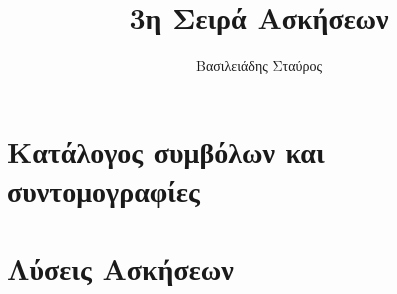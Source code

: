 \documentclass[twoside, openright, hidelinks, a4paper, 12pt]{book}%
\title{\color{teal}3η Σειρά Ασκήσεων}
\author{Βασιλειάδης Σταύρος}
\newcommand\AtPageUpperRight[1]{\AtPageUpperLeft{%
		\put(\LenToUnit{\paperwidth},\LenToUnit{0\paperheight}){#1}%
}}%
\newcommand\AtPageLowerRight[1]{\AtPageLowerLeft{%
		\put(\LenToUnit{\paperwidth},\LenToUnit{0\paperheight}){#1}%
}}%
\newcommand{\beautify}{%
	\AddToShipoutPictureBG{%
		\AtPageUpperLeft{\put(0,-25){\pgfornament[width=1.75cm]{61}}}
		\AtPageUpperRight{\put(-50,-25){\pgfornament[width=1.75cm,symmetry=v]{61}}}
		\AtPageLowerLeft{\put(0,25){\pgfornament[width=1.75cm,symmetry=h]{61}}}
		\AtPageLowerRight{\put(-50,25){\pgfornament[width=1.75cm,symmetry=c]{61}}}
	}
}
\newcommand{\simplify}{%
}
\begin{document}
	




\renewcommand{\contentsname}{Περιεχόμενα}
\renewcommand{\listfigurename}{Λίστα Σχημάτων}
\renewcommand{\listtablename}{Λίστα Πινάκων}
\renewcommand{\chaptername}{\centering{ΜΕΡΟΣ}}
\renewcommand{\appendixname}{Παράρτημα}
\renewcommand{\bibname}{Βιβλιογραφία}
\renewcommand\thesection{\color{violet}\arabic{section}}
\chapterfont{\color{magenta}}

\makeatletter
\newcommand*{\greek}[1]{%
	\expandafter\@greek\csname c@#1\endcsname
}
\newcommand*{\@greek}[1]{%
	$\ifcase#1\or\alpha\or\beta\or\gamma\or\delta\or\varepsilon
	\or\zeta\or\eta\or\theta\or\iota\or\kappa\or\lambda
	\or\mu\or\nu\or\xi\or o\or\pi\or\varrho\or\sigma
	\or\tau\or\upsilon\or\phi\or\chi\or\psi\or\omega
	\else\@ctrerr\fi$
}

\renewcommand{\thesubsection}{\thesection\;-\;\greek{subsection}}


\setlength{\parskip}{0.5em}     %


\setlength{\parskip}{1em}       %
\begingroup
\pagestyle{empty}

	\tableofcontents
\endgroup

	\clearpage

	\cleardoublepage
\doublespacing
\chapter{Κατάλογος συμβόλων και συντομογραφίες}
\label{ch:ChapterName}
\simplify
	
\clearpage

\cleardoublepage
\setcounter{page}{1}
	\chapter{Λύσεις Ασκήσεων}
	\label{ch:ChapterName}
	\simplify


	
	
	
	\newpage
\end{document}
